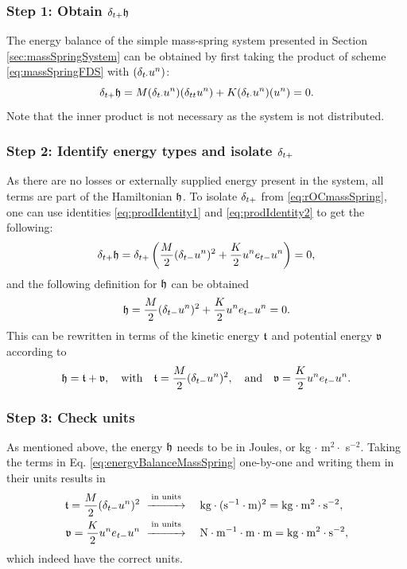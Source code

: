 {{{{\subsubsection{Step 1: Obtain $\delta_{t+} \mathfrak{h}$}
The energy balance of the simple mass-spring system presented in Section \ref{sec:massSpringSystem} can be obtained by first taking the product of scheme \eqref{eq:massSpringFDS} with $(\delta_{t\cdot} u^n)$:
\begin{equation}\label{eq:rOCmassSpring}
    \delta_{t+} \mathfrak{h} = M(\delta_{t\cdot}u^n)(\delta_{tt} u^n) + K(\delta_{t\cdot}u^n)(u^n) = 0.
\end{equation}
Note that the inner product is not necessary as the system is not distributed.

\subsubsection{Step 2: Identify energy types and isolate $\delta_{t+}$}
As there are no losses or externally supplied energy present in the system, all terms are part of the Hamiltonian $\mathfrak{h}$. To isolate $\delta_{t+}$ from \eqref{eq:rOCmassSpring}, one can use identities \eqref{eq:prodIdentity1} and \eqref{eq:prodIdentity2} to get the following:
\begin{equation}
    \delta_{t+} \mathfrak{h} = \delta_{t+}\left(\frac{M}{2}(\delta_{t-}u^n)^2 + \frac{K}{2}u^n e_{t-}u^n\right) = 0,
\end{equation}
and the following definition for $\mathfrak{h}$ can be obtained
\begin{equation}
    \mathfrak{h} = \frac{M}{2}(\delta_{t-}u^n)^2 + \frac{K}{2}u^n e_{t-}u^n = 0.
\end{equation}
This can be rewritten in terms of the kinetic energy $\mathfrak{t}$ and potential energy $\mathfrak{v}$ according to
\begin{equation}\label{eq:energyBalanceMassSpring}
    \mathfrak{h} = \mathfrak{t} + \mathfrak{v}, \quad \text{with} \quad
    \mathfrak{t} = \frac{M}{2}(\delta_{t-}u^n)^2, \quad \text{and} \quad \mathfrak{v} = \frac{K}{2}u^n e_{t-}u^n.
\end{equation} 

\subsubsection{Step 3: Check units}
As mentioned above, the energy $\mathfrak{h}$ needs to be in Joules, or kg $\cdot$ m$^2 \cdot$ s$^{-2}$. Taking the terms in Eq. \eqref{eq:energyBalanceMassSpring} one-by-one and writing them in their units results in 
\begin{align*}
    \mathfrak{t} = \frac{M}{2}(\delta_{t-}u^n)^2 &\ \overset{\text{in units}}{\xrightarrow{\hspace*{1cm}}} \quad\text{kg}\cdot(\text{s}^{-1}\cdot \text{m})^{2}= \text{kg}\cdot\text{m}^2\cdot\text{s}^{-2},\\
    \mathfrak{v} = \frac{K}{2}u^n e_{t-}u^n&\ \overset{\text{in units}}{\xrightarrow{\hspace*{1cm}}} \quad \text{N} \cdot \text{m}^{-1} \cdot \text{m}\cdot \text{m} = \text{kg}\cdot\text{m}^2\cdot\text{s}^{-2},
\end{align*}
which indeed have the correct units. 

}}}}
